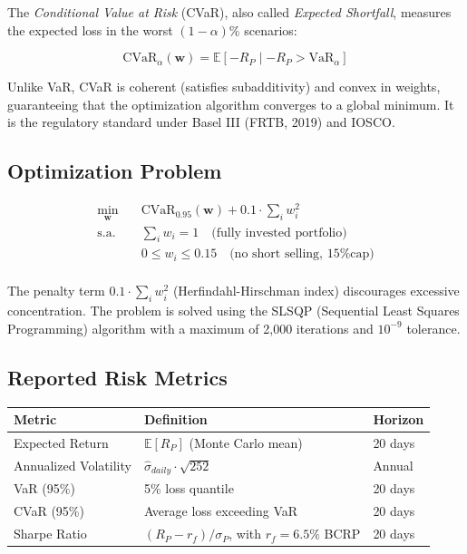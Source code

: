 \documentclass[11pt,a4paper]{article}
\begin{document}
The \textit{Conditional Value at Risk} (CVaR), also called \textit{Expected Shortfall},
measures the expected loss in the worst $(1-\alpha)$\% scenarios:

\begin{equation}
    \text{CVaR}_\alpha(\mathbf{w}) = \mathbb{E}\left[-R_P \mid -R_P > \text{VaR}_\alpha\right]
\end{equation}

Unlike VaR, CVaR is coherent (satisfies subadditivity) and convex in weights,
guaranteeing that the optimization algorithm converges to a global minimum. It is the regulatory
standard under Basel III (FRTB, 2019) and IOSCO.

\subsection{Optimization Problem}

\begin{equation}
\begin{aligned}
    \min_{\mathbf{w}} \quad & \text{CVaR}_{0.95}(\mathbf{w}) + 0.1 \cdot \sum_i w_i^2 \\
    \text{s.a.} \quad & \sum_i w_i = 1 \quad \text{(fully invested portfolio)} \\
                     & 0 \leq w_i \leq 0.15 \quad \text{(no short selling, 15\% cap)} \\
\end{aligned}
\end{equation}

The penalty term $0.1 \cdot \sum_i w_i^2$ (Herfindahl-Hirschman index) discourages excessive
concentration. The problem is solved using the SLSQP (Sequential Least Squares Programming) algorithm
with a maximum of 2,000 iterations and $10^{-9}$ tolerance.

\subsection{Reported Risk Metrics}

\begin{center}
\begin{tabular}{lll}
\toprule
\rowcolor{lightgray}
\textbf{Metric} & \textbf{Definition} & \textbf{Horizon} \\
\midrule
Expected Return & $\mathbb{E}[R_P]$ (Monte Carlo mean) & 20 days \\
Annualized Volatility & $\hat{\sigma}_{daily} \cdot \sqrt{252}$ & Annual \\
VaR (95\%) & 5\% loss quantile & 20 days \\
CVaR (95\%) & Average loss exceeding VaR & 20 days \\
Sharpe Ratio & $(R_P - r_f) / \sigma_P$, with $r_f = 6.5\%$ BCRP & 20 days \\
\bottomrule
\end{tabular}
\end{center}
\end{document}
